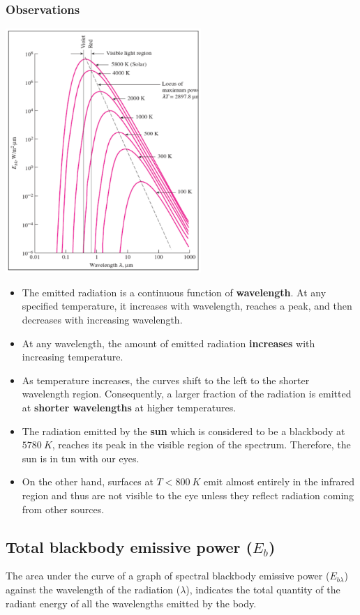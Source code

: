 \documentclass[11pt]{article}
\begin{document}
\subsubsection{Observations}
\label{sec:org8b57c82}
\begin{center}
\includegraphics[height=25em]{./images/wiens-displacement-law-diagram.png}
\end{center}
\begin{itemize}
\item The emitted radiation is a continuous function of \textbf{wavelength}. At any specified temperature, it increases with wavelength, reaches a peak, and then decreases with increasing wavelength.
\item At any wavelength, the amount of emitted radiation \textbf{increases} with increasing temperature.
\item As temperature increases, the curves shift to the left to the shorter wavelength region. Consequently, a larger fraction of the radiation is emitted at \textbf{shorter wavelengths} at higher temperatures.
\item The radiation emitted by the \textbf{sun} which is considered to be a blackbody at \(\qty{5780}{K}\), reaches its peak in the visible region of the spectrum. Therefore, the sun is in tun with our eyes.
\item On the other hand, surfaces at \(T < \qty{800}{K}\) emit almost entirely in the infrared region and thus are not visible to the eye unless they reflect radiation coming from other sources.
\end{itemize}
\subsection{Total blackbody emissive power (\(E_b\))}
\label{sec:org69fe176}
The area under the curve of a graph of spectral blackbody emissive power (\(E_{b \lambda}\)) against the wavelength of the radiation (\(\lambda\)), indicates the total quantity of the radiant energy of all the wavelengths emitted by the body.
\end{document}
